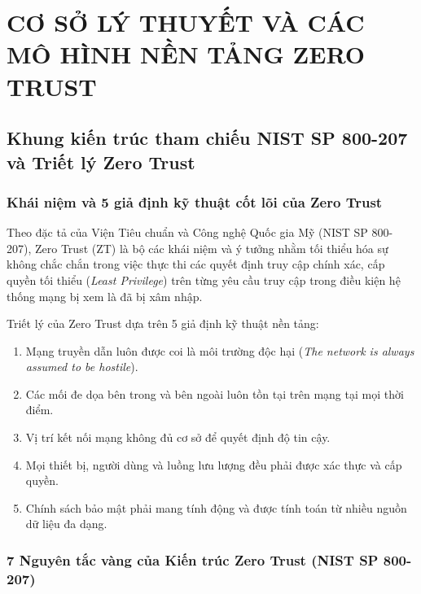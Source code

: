 \chapter{CƠ SỞ LÝ THUYẾT VÀ CÁC MÔ HÌNH NỀN TẢNG ZERO TRUST}
\label{chap:chuong_2}

\section{Khung kiến trúc tham chiếu NIST SP 800-207 và Triết lý Zero Trust}
\label{sec:2_1}

\subsection{Khái niệm và 5 giả định kỹ thuật cốt lõi của Zero Trust}
\label{subsec:2_1_1}

Theo đặc tả của Viện Tiêu chuẩn và Công nghệ Quốc gia Mỹ (NIST SP 800-207), Zero Trust (ZT) là bộ các khái niệm và ý tưởng nhằm tối thiểu hóa sự không chắc chắn trong việc thực thi các quyết định truy cập chính xác, cấp quyền tối thiểu (\textit{Least Privilege}) trên từng yêu cầu truy cập trong điều kiện hệ thống mạng bị xem là đã bị xâm nhập.

Triết lý của Zero Trust dựa trên 5 giả định kỹ thuật nền tảng:
\begin{enumerate}
    \item Mạng truyền dẫn luôn được coi là môi trường độc hại (\textit{The network is always assumed to be hostile}).
    \item Các mối đe dọa bên trong và bên ngoài luôn tồn tại trên mạng tại mọi thời điểm.
    \item Vị trí kết nối mạng không đủ cơ sở để quyết định độ tin cậy.
    \item Mọi thiết bị, người dùng và luồng lưu lượng đều phải được xác thực và cấp quyền.
    \item Chính sách bảo mật phải mang tính động và được tính toán từ nhiều nguồn dữ liệu đa dạng.
\end{enumerate}

\subsection{7 Nguyên tắc vàng của Kiến trúc Zero Trust (NIST SP 800-207)}
\label{subsec:2_1_2}

